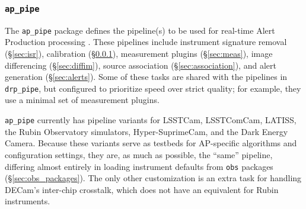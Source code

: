 \subsubsection{\texttt{ap\_pipe}}

The \texttt{ap\_pipe} package defines the pipeline(s) to be used for real-time Alert Production processing \citep{DMTN-219}.
These pipelines include instrument signature removal (\S\ref{sec:isr}), calibration (\S\ref{}), measurement plugins (\S\ref{sec:meas}), image differencing (\S\ref{sec:diffim}), source association (\S\ref{sec:association}), and alert generation (\S\ref{sec:alerts}).
Some of these tasks are shared with the pipelines in \texttt{drp\_pipe}, but configured to prioritize speed over strict quality; for example, they use a minimal set of measurement plugins.

\texttt{ap\_pipe} currently has pipeline variants for LSSTCam, LSSTComCam, LATISS, the Rubin Observatory simulators, Hyper-SuprimeCam, and the Dark Energy Camera.
Because these variants serve as testbeds for AP-specific algorithms and configuration settings, they are, as much as possible, the ``same'' pipeline, differing almost entirely in loading instrument defaults from \texttt{obs} packages (\S\ref{sec:obs_packages}).
The only other customization is an extra task for handling DECam's inter-chip crosstalk, which does not have an equivalent for Rubin instruments.
